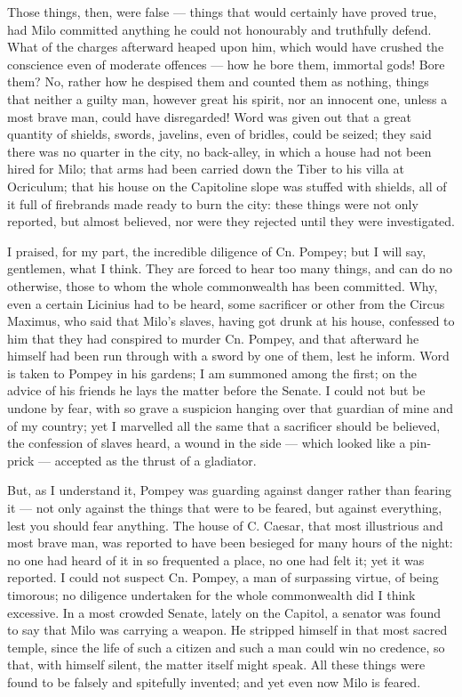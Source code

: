  Those things, then, were false --- things that would certainly have proved true, had Milo committed anything he could not honourably and truthfully defend. What of the charges afterward heaped upon him, which would have crushed the conscience even of moderate offences --- how he bore them, immortal gods! Bore them? No, rather how he despised them and counted them as nothing, things that neither a guilty man, however great his spirit, nor an innocent one, unless a most brave man, could have disregarded! Word was given out that a great quantity of shields, swords, javelins, even of bridles, could be seized; they said there was no quarter in the city, no back-alley, in which a house had not been hired for Milo; that arms had been carried down the Tiber to his villa at Ocriculum; that his house on the Capitoline slope was stuffed with shields, all of it full of firebrands made ready to burn the city: these things were not only reported, but almost believed, nor were they rejected until they were investigated.

 I praised, for my part, the incredible diligence of Cn. Pompey; but I will say, gentlemen, what I think. They are forced to hear too many things, and can do no otherwise, those to whom the whole commonwealth has been committed. Why, even a certain Licinius had to be heard, some sacrificer or other from the Circus Maximus, who said that Milo's slaves, having got drunk at his house, confessed to him that they had conspired to murder Cn. Pompey, and that afterward he himself had been run through with a sword by one of them, lest he inform. Word is taken to Pompey in his gardens; I am summoned among the first; on the advice of his friends he lays the matter before the Senate. I could not but be undone by fear, with so grave a suspicion hanging over that guardian of mine and of my country; yet I marvelled all the same that a sacrificer should be believed, the confession of slaves heard, a wound in the side --- which looked like a pin-prick --- accepted as the thrust of a gladiator.

 But, as I understand it, Pompey was guarding against danger rather than fearing it --- not only against the things that were to be feared, but against everything, lest you should fear anything. The house of C. Caesar, that most illustrious and most brave man, was reported to have been besieged for many hours of the night: no one had heard of it in so frequented a place, no one had felt it; yet it was reported. I could not suspect Cn. Pompey, a man of surpassing virtue, of being timorous; no diligence undertaken for the whole commonwealth did I think excessive. In a most crowded Senate, lately on the Capitol, a senator was found to say that Milo was carrying a weapon. He stripped himself in that most sacred temple, since the life of such a citizen and such a man could win no credence, so that, with himself silent, the matter itself might speak. All these things were found to be falsely and spitefully invented; and yet even now Milo is feared.

